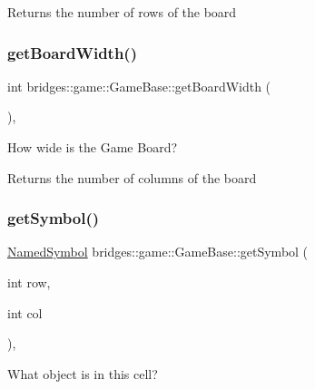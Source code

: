 \begin{DoxyReturn}{Returns}
the number of rows of the board 
\end{DoxyReturn}
\mbox{\label{classbridges_1_1game_1_1_game_base_ad74bf992cced25e9997fbf8a63bf8157}} 
\subsubsection{\texorpdfstring{get\+Board\+Width()}{getBoardWidth()}}
{\footnotesize\ttfamily int bridges\+::game\+::\+Game\+Base\+::get\+Board\+Width (\begin{DoxyParamCaption}{ }\end{DoxyParamCaption})\hspace{0.3cm}{\ttfamily [inline]}, {\ttfamily [protected]}}



How wide is the Game Board? 

\begin{DoxyReturn}{Returns}
the number of columns of the board 
\end{DoxyReturn}
\mbox{\label{classbridges_1_1game_1_1_game_base_a0dfec715b0ed49c37b4b6689f2470b25}} 
\subsubsection{\texorpdfstring{get\+Symbol()}{getSymbol()}}
{\footnotesize\ttfamily \mbox{\hyperlink{namespacebridges_1_1game_ab9a19c7ab6e2ebac2f95180e21733487}{Named\+Symbol}} bridges\+::game\+::\+Game\+Base\+::get\+Symbol (\begin{DoxyParamCaption}\item[{int}]{row,  }\item[{int}]{col }\end{DoxyParamCaption})\hspace{0.3cm}{\ttfamily [inline]}, {\ttfamily [protected]}}



What object is in this cell? 


